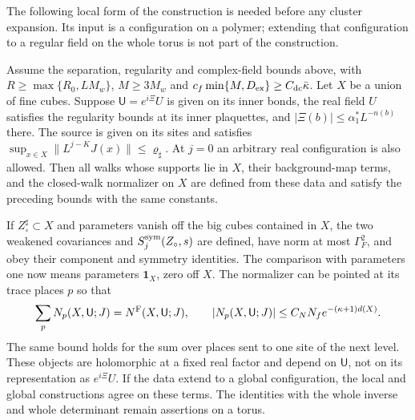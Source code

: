 \documentclass[11pt,letterpaper,reqno]{amsart}
\makeatletter
\theoremstyle{definition}
\newcommand{\ms@minorstart}{%
  \pushQED{\qed}\renewcommand{\qedsymbol}{$\blacksquare$}}
\newenvironment{lemma}[1][]{\ms@minorstart\ms@lemma[#1]}
  {\popQED\endms@lemma}
\theoremstyle{remark}
\makeatother
\begin{document}
The following local form of the construction is needed before any
cluster expansion.  Its input is a configuration on a polymer;
extending that configuration to a regular field on the whole torus
is not part of the construction.

\begin{lemma}[Operators formed on a polymer]\label{C-397-47}
Assume the separation, regularity and complex-field bounds above,
with $R\ge\max\{R_0,LM_w\}$, $M\ge3M_w$ and
$c_f\min\{M,D_{\rm ex}\}\ge C_{\rm dc}\bar\kappa$.
Let $X$ be a union of fine cubes.  Suppose $\mathsf U=e^{i\Xi}U$
is given on its inner bonds, the real field $U$ satisfies the
regularity bounds at its inner plaquettes, and
$|\Xi(b)|\le\alpha_1^*L^{-n(b)}$ there.  The source is given
on its sites and satisfies
$\sup_{x\in X}\|L^{j-K}J(x)\|\le\varrho_\sharp$.
At $j=0$ an arbitrary real configuration is also allowed.
Then all walks whose supports lie in $X$, their background-map
terms, and the closed-walk normalizer on $X$ are defined from
these data and satisfy the preceding bounds with the same constants.

If $Z_\circ^\sharp\subset X$ and parameters vanish off the big
cubes contained in $X$, the two weakened covariances and
$S_j^{\rm sym}(Z_\circ,s)$ are defined, have norm at most
$\Gamma_F^2$, and obey their component and symmetry identities.
The comparison with parameters one now means parameters
$\mathbf1_X$, zero off $X$.
The normalizer can be pointed at its trace places $p$ so that
\[
 \sum_pN_p(X,\mathsf U;J)=N^{\rm F}(X,\mathsf U;J),\qquad
 |N_p(X,\mathsf U;J)|\le C_NN_fe^{-(\kappa+1)d(X)}.
\]
The same bound holds for the sum over places sent to one site
of the next level.  These objects are holomorphic at a fixed
real factor and depend on $\mathsf U$, not on its representation
as $e^{i\Xi}U$.  If the data extend to a global configuration,
the local and global constructions agree on these terms.
The identities with the whole inverse and whole determinant
remain assertions on a torus.
\end{lemma}
\end{document}

